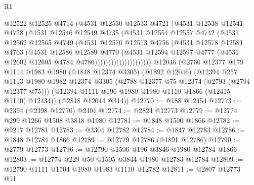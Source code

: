 \begin{lexlean}{R1}
\begin{coremodule}
                          @12522
                          @12525
                          @4714
                          (@4531
                            @12530
                            @12533
                            @4721
                            (@4531
                              @12538
                              @12541
                              @4728
                              (@4531
                                @12546
                                @12549
                                @4735
                                (@4531
                                  @12554
                                  @12557
                                  @4742
                                  (@4531
                                    @12562
                                    @12565
                                    @4749
                                    (@4531
                                      @12570
                                      @12573
                                      @4756
                                      (@4531
                                        @12578
                                        @12581
                                        @4763
                                        (@4531
                                          @12586
                                          @12589
                                          @4770
                                          (@4531
                                            @12594
                                            @12597
                                            @4777
                                            (@4531 @12602 @12605 @4784 @4786)))))))))))))))))))))
    @12046
    (@2766
      @12377
      @179
      @1114
      @1983
      @1980
      (@1848 @12374 @3305)
      (@1892 @12046)
      (@12394
        @257
        @1113
        @1980
        @1982
        @12374
        @3305
        (@2788 @12377 @75 @12374 (@2793 (@2794 @12377 @75)))
        (@12394 @1111 @196 @1980 @1980 @1110 @1866 (@12415 @1110) @12434))
      (@2818 @12044 @314))
@12770 := @188 @12454
@12773 := @2394 (@2398 @12770) @2401
@12774 := @2824 @12773
@12779 := @12774 @299 @1266 @1508 @3848 @1980
@12781 := @1848 @1500 @1866
@12782 := @9217 @12781
@12783 := @3304 @12782
@12784 := @1847 @12783
@12786 := @1848 @12784 @1866
@12789 := @12779 @12786 (@1891 @12786)
@12790 := @2779 @12773
@12796 := @12790 @1506 @196 @3846 @1980 @12784 @1866
@12803 := @12774 @229 @50 @1505 @3844 @1980 @12783 @12784
@12809 := @12790 @1111 @1504 @1980 @1983 @1110 @12782
@12811 := @2807 @12773 @11

\end{coremodule}
\end{lexlean}
